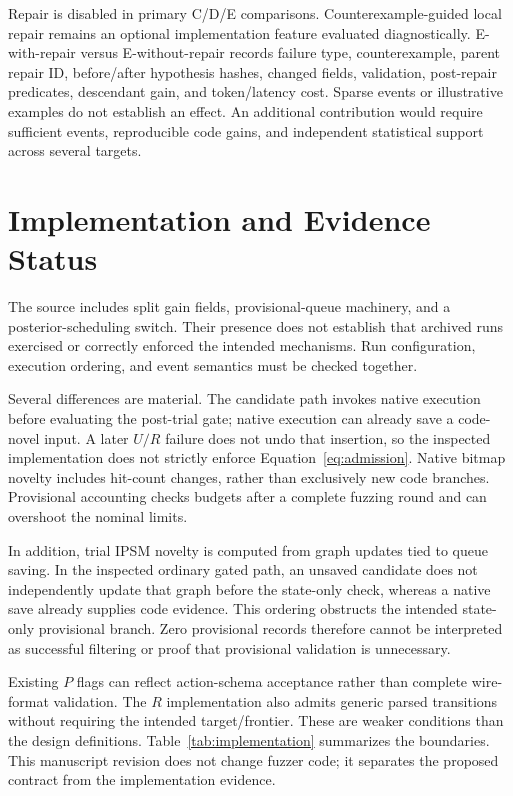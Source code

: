 \documentclass[final,5p,times,number]{elsarticle}
\begin{document}
Repair is disabled in primary C/D/E comparisons. Counterexample-guided local repair remains an optional implementation feature evaluated diagnostically. E-with-repair versus E-without-repair records failure type, counterexample, parent repair ID, before/after hypothesis hashes, changed fields, validation, post-repair predicates, descendant gain, and token/latency cost. Sparse events or illustrative examples do not establish an effect. An additional contribution would require sufficient events, reproducible code gains, and independent statistical support across several targets.


\section{Implementation and Evidence Status}
\label{sec:implementation}
The source includes split gain fields, provisional-queue machinery, and a posterior-scheduling switch. Their presence does not establish that archived runs exercised or correctly enforced the intended mechanisms. Run configuration, execution ordering, and event semantics must be checked together.

Several differences are material. The candidate path invokes native execution before evaluating the post-trial gate; native execution can already save a code-novel input. A later $U/R$ failure does not undo that insertion, so the inspected implementation does not strictly enforce Equation~\ref{eq:admission}. Native bitmap novelty includes hit-count changes, rather than exclusively new code branches. Provisional accounting checks budgets after a complete fuzzing round and can overshoot the nominal limits.

In addition, trial IPSM novelty is computed from graph updates tied to queue saving. In the inspected ordinary gated path, an unsaved candidate does not independently update that graph before the state-only check, whereas a native save already supplies code evidence. This ordering obstructs the intended state-only provisional branch. Zero provisional records therefore cannot be interpreted as successful filtering or proof that provisional validation is unnecessary.

Existing $P$ flags can reflect action-schema acceptance rather than complete wire-format validation. The $R$ implementation also admits generic parsed transitions without requiring the intended target/frontier. These are weaker conditions than the design definitions. Table~\ref{tab:implementation} summarizes the boundaries. This manuscript revision does not change fuzzer code; it separates the proposed contract from the implementation evidence.
\end{document}
